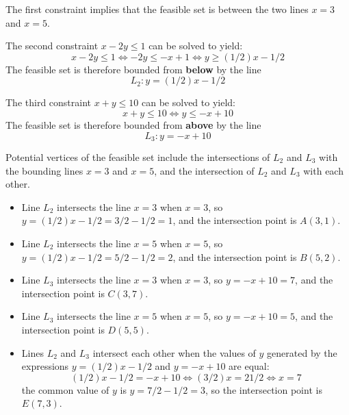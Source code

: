 \documentclass{article}
\begin{document}
The first constraint implies that the feasible set is between the two lines \(x = 3\) and \(x = 5\).

The second constraint \(x - 2y \leq 1\) can be solved to yield:
\[x - 2y \leq 1 \iff -2y \leq -x + 1 \iff y \geq (1/2)x - 1/2\]
The feasible set is therefore bounded from {\bf below} by the line
\[L_2 : y = (1/2)x - 1/2\]

The third constraint \(x + y \leq 10\) can be solved to yield:
\[x + y \leq 10 \iff y \leq -x + 10\]
The feasible set is therefore bounded from {\bf above} by the line
\[L_3 : y = -x + 10\]

Potential vertices of the feasible set include the intersections of \(L_2\) and \(L_3\) with the bounding lines \(x = 3\) and \(x = 5\), and the intersection of \(L_2\) and \(L_3\) with each other. 
\begin{itemize}
\item Line \(L_2\) intersects the line \(x = 3\) when \(x = 3\), so \(y = (1/2)x - 1/2 = 3/2 - 1/2 = 1\), and the intersection point is \(A(3, 1)\). 
\item Line \(L_2\) intersects the line \(x = 5\) when \(x = 5\), so \(y = (1/2)x - 1/2 = 5/2 - 1/2 = 2\), and the intersection point is \(B(5, 2)\). 
\item Line \(L_3\) intersects the line \(x = 3\) when \(x = 3\), so \(y = -x + 10 = 7\), and the intersection point is \(C(3, 7)\). 
\item Line \(L_3\) intersects the line \(x = 5\) when \(x = 5\), so \(y = -x + 10 = 5\), and the intersection point is \(D(5, 5)\). 
\item Lines \(L_2\) and \(L_3\) intersect each other when the values of \(y\) generated by the expressions \(y = (1/2)x - 1/2\) and \(y = -x + 10\) are equal:
\[(1/2)x - 1/2 = -x + 10 \iff (3/2)x = 21/2 \iff x = 7\]
the common value of \(y\) is \(y = 7/2 - 1/2 = 3\), so the intersection point is \(E(7, 3)\).
\end{itemize}
\end{document}
